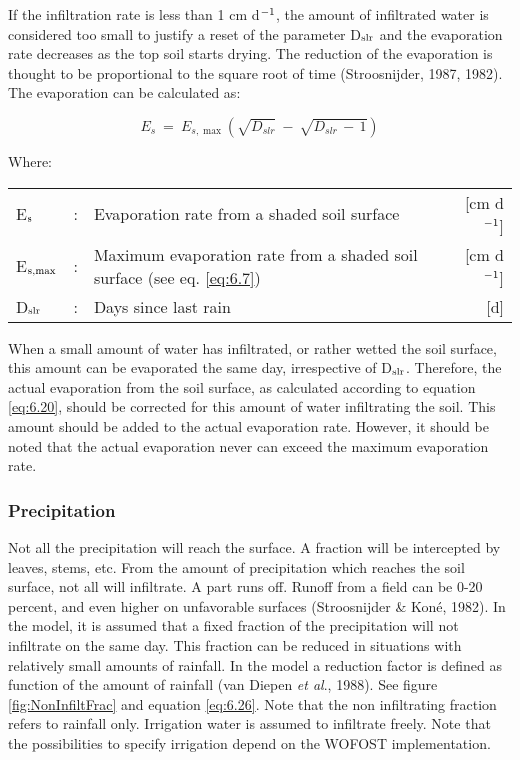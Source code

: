 If the infiltration rate is less than 1 cm d$^{{\rm -1}}$, the amount of infiltrated water is considered
too small to justify a reset of the parameter D$_{{\rm slr}}$ and the evaporation rate decreases as the
top soil starts drying. The reduction of the evaporation is thought to be proportional to the
square root of time (Stroosnijder, 1987, 1982). The evaporation can be calculated as:

\begin{equation}
\label{eq:6.20}
E _{s} ~=~ E _{s,\max } ( \sqrt{D _{slr} } ~-~ \sqrt{D _{slr} \, -\, 1} )
\end{equation}

Where:\\[5pt]
\begin{tabularx}{\textwidth}{llXr}
	E$_{{\rm s}}$ &:& Evaporation rate from a shaded soil surface  & [cm d$^{{\rm -1}}$]\\
	E$_{{\rm s,max}}$ &:& Maximum evaporation rate from a shaded soil
	surface (see eq. \ref{eq:6.7})  & [cm d$^{{\rm -1}}$]\\
	D$_{{\rm slr}}$ &:& Days since last rain  & [d]\\
\end{tabularx}

When a small amount of water has infiltrated, or rather wetted the soil surface, this
amount can be evaporated the same day, irrespective of D$_{{\rm slr}}$. Therefore, the actual
evaporation from the soil surface, as calculated according to equation \ref{eq:6.20}, should be
corrected for this amount of water infiltrating the soil. This amount should be added to
the actual evaporation rate. However, it should be noted that the actual evaporation never
can exceed the maximum evaporation rate.

\subsubsection{Precipitation}
Not all the precipitation will reach the surface. A fraction will be intercepted by leaves,
stems, etc. From the amount of precipitation which reaches the soil surface, not all will
infiltrate. A part runs off. Runoff from a field can be 0-20 percent, and even higher on
unfavorable surfaces (Stroosnijder \& Kon\'{e}, 1982). In the model, it is assumed that a
fixed fraction of the precipitation will not infiltrate on the same day. This fraction can be
reduced in situations with relatively small amounts of rainfall. In the model a reduction
factor is defined as function of the amount of rainfall (van Diepen {\it et al}., 1988). See 
figure \ref{fig:NonInfiltFrac} and equation \ref{eq:6.26}. Note that the non infiltrating 
fraction refers to rainfall only. Irrigation water is assumed to infiltrate freely. Note
that the possibilities to specify irrigation depend on the WOFOST implementation.

